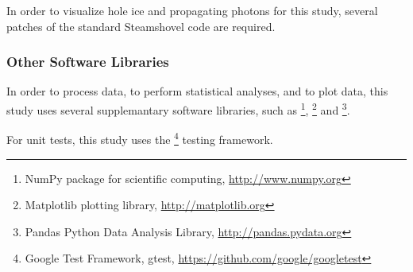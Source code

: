 In order to visualize hole ice and propagating photons for this study, several patches of the standard Steamshovel code are required.



\subsubsection{Other Software Libraries}

In order to process data, to perform statistical analyses, and to plot data, this study uses several supplemantary software libraries, such as \footnote{NumPy package for scientific computing, \url{http://www.numpy.org}}, \footnote{Matplotlib plotting library, \url{http://matplotlib.org}} and \footnote{Pandas Python Data Analysis Library, \url{http://pandas.pydata.org}}.


For unit tests, this study uses the \footnote{Google Test Framework, gtest, \url{https://github.com/google/googletest}} testing framework.

